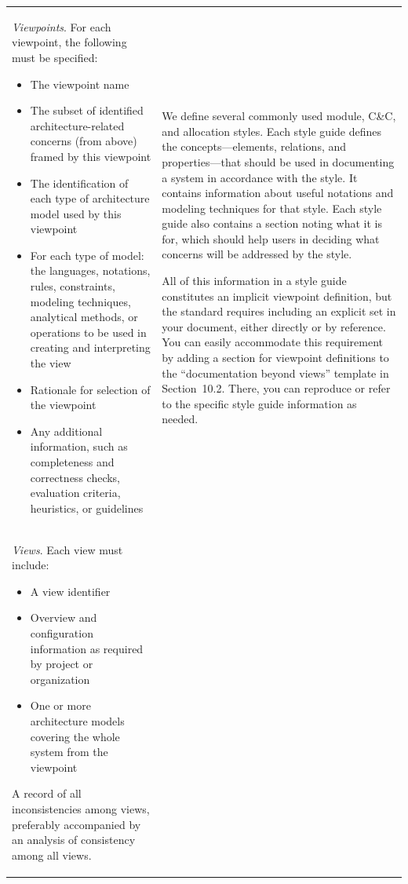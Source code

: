 \documentclass[11pt]{article}
\begin{document}
\begin{tabularx}{\textwidth}{@{}%
  >{\raggedright\arraybackslash}p{}%
  >{\raggedright\arraybackslash}p{}@{}}
\textit{Viewpoints}. For each viewpoint, the following must be specified:
\begin{itemize}
  \item The viewpoint name
  \item The subset of identified architecture-related concerns (from above)
        framed by this viewpoint
  \item The identification of each type of architecture model used by this
        viewpoint
  \item For each type of model: the languages, notations, rules, constraints,
        modeling techniques, analytical methods, or operations to be used in
        creating and interpreting the view
  \item Rationale for selection of the viewpoint
  \item Any additional information, such as completeness and correctness
        checks, evaluation criteria, heuristics, or guidelines
\end{itemize}
&
We define several commonly used module, C\&C, and allocation styles. Each
style guide defines the concepts---elements, relations, and
properties---that should be used in documenting a system in accordance with
the style. It contains information about useful notations and modeling
techniques for that style. Each style guide also contains a section noting
what it is for, which should help users in deciding what concerns will be
addressed by the style.

All of this information in a style guide constitutes an implicit viewpoint
definition, but the standard requires including an explicit set in your
document, either directly or by reference. You can easily accommodate this
requirement by adding a section for viewpoint definitions to the
``documentation beyond views'' template in Section~10.2. There, you can
reproduce or refer to the specific style guide information as needed. \\
\addlinespace[0.6em]

\textit{Views}. Each view must include:
\begin{itemize}
  \item A view identifier
  \item Overview and configuration information as required by project or
        organization
  \item One or more architecture models covering the whole system from the
        viewpoint
\end{itemize}
A record of all inconsistencies among views, preferably accompanied by an
analysis of consistency among all views.


\end{tabularx}
\end{document}
